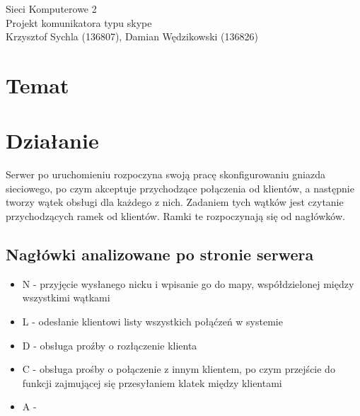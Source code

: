 \documentclass[a4paper]{article}
\begin{document}
	\begin{center}
		{\huge Sieci Komputerowe 2} \\
		{\LARGE Projekt komunikatora typu skype}\\
		Krzysztof Sychla (136807),
		Damian Wędzikowski (136826)
	\end{center}
	
	\section*{Temat}
	
	\section*{Działanie}
		Serwer po uruchomieniu rozpoczyna swoją pracę skonfigurowaniu gniazda sieciowego, po czym akceptuje przychodzące połączenia od klientów, a następnie tworzy wątek obsługi dla każdego z nich. Zadaniem tych wątków jest czytanie przychodzących ramek od klientów. Ramki te rozpoczynają się od nagłówków.
		\subsection*{Nagłówki analizowane po stronie serwera}
		\begin{itemize}
			\item N - przyjęcie wysłanego nicku i wpisanie go do mapy, współdzielonej między wszystkimi wątkami
			\item L - odesłanie klientowi listy wszystkich połąćzeń w systemie
			\item D - obsługa proźby o rozłączenie klienta
			\item C - obsługa prośby o połączenie z innym klientem, po czym przejście do funkcji zajmującej się przesyłaniem klatek między klientami
			\item A - 
		\end{itemize}
	
\end{document}
